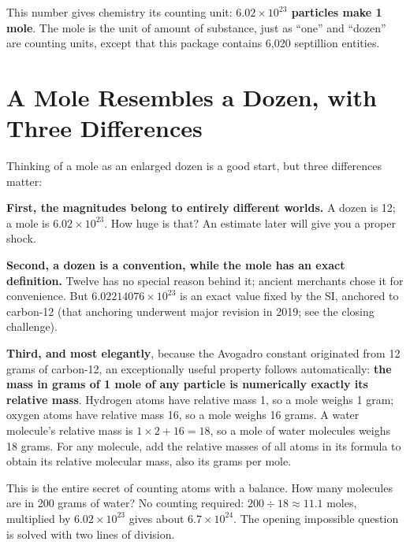 This number gives chemistry its counting unit: \textbf{$6.02\times 10^{23}$ particles make 1 mole}. The mole is the unit of amount of substance, just as ``one'' and ``dozen'' are counting units, except that this package contains 6,020 septillion entities.

\section{A Mole Resembles a Dozen, with Three Differences}

Thinking of a mole as an enlarged dozen is a good start, but three differences matter:

\textbf{First, the magnitudes belong to entirely different worlds.} A dozen is 12; a mole is $6.02\times 10^{23}$. How huge is that? An estimate later will give you a proper shock.

\textbf{Second, a dozen is a convention, while the mole has an exact definition.} Twelve has no special reason behind it; ancient merchants chose it for convenience. But $6.02214076\times 10^{23}$ is an exact value fixed by the SI, anchored to carbon-12 (that anchoring underwent major revision in 2019; see the closing challenge).

\textbf{Third, and most elegantly}, because the Avogadro constant originated from 12 grams of carbon-12, an exceptionally useful property follows automatically: \textbf{the mass in grams of 1 mole of any particle is numerically exactly its relative mass}. Hydrogen atoms have relative mass 1, so a mole weighs 1 gram; oxygen atoms have relative mass 16, so a mole weighs 16 grams. A water molecule's relative mass is $1\times 2+16=18$, so a mole of water molecules weighs 18 grams. For any molecule, add the relative masses of all atoms in its formula to obtain its relative molecular mass, also its grams per mole.

This is the entire secret of counting atoms with a balance. How many molecules are in 200 grams of water? No counting required: $200\div 18\approx 11.1$ moles, multiplied by $6.02\times 10^{23}$ gives about $6.7\times 10^{24}$. The opening impossible question is solved with two lines of division.

